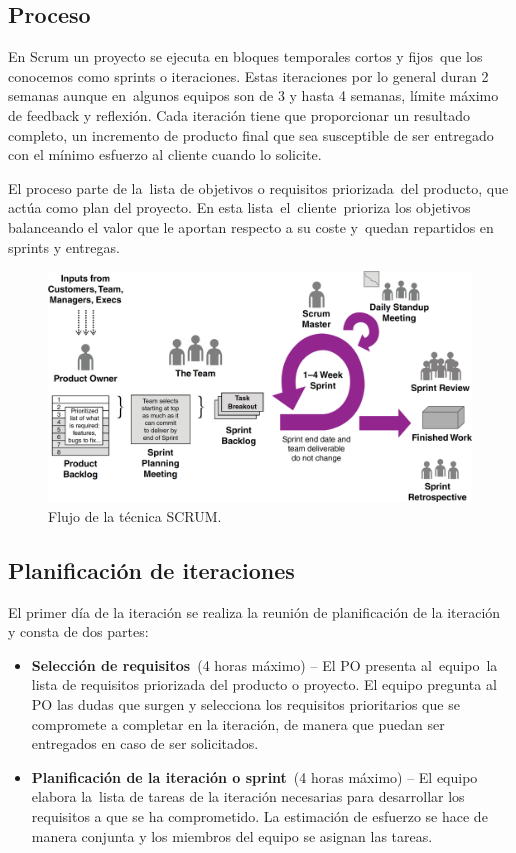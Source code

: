 \subsection{Proceso}
En Scrum un proyecto se ejecuta en bloques temporales cortos y fijos que los conocemos como sprints o iteraciones. Estas iteraciones por lo general duran 2 semanas aunque en algunos equipos son de 3 y hasta 4 semanas, límite máximo de feedback y reflexión\citep{davis_agile_2015}. Cada iteración tiene que proporcionar un resultado completo, un incremento de producto final que sea susceptible de ser entregado con el mínimo esfuerzo al cliente cuando lo solicite.

El proceso parte de la lista de objetivos o requisitos priorizada del producto, que actúa como plan del proyecto. En esta lista el cliente prioriza los objetivos balanceando el valor que le aportan respecto a su coste y quedan repartidos en sprints y entregas.

\begin{figure}[H]
\centering
\includegraphics[width=125mm,scale=1]{Figuras/flujo_scrum}
\caption{Flujo de la técnica SCRUM.}
  \label{flujo_scrum}
\end{figure}

\subsection{Planificación de iteraciones}
El primer día de la iteración se realiza la reunión de planificación de la iteración y consta de dos partes:
\begin{itemize}
    \item \textbf{Selección de requisitos} (4 horas máximo) – El PO presenta al equipo la lista de requisitos priorizada del producto o proyecto. El equipo pregunta al PO las dudas que surgen y selecciona los requisitos prioritarios que se compromete a completar en la iteración, de manera que puedan ser entregados en caso de ser solicitados.
    \item \textbf{Planificación de la iteración o sprint} (4 horas máximo) – El equipo elabora la lista de tareas de la iteración necesarias para desarrollar los requisitos a que se ha comprometido. La estimación de esfuerzo se hace de manera conjunta y los miembros del equipo se asignan las tareas.
\end{itemize}

